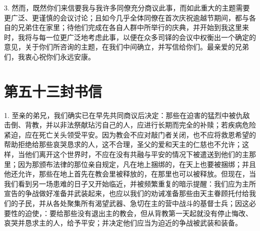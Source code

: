 3. 然而，既然你们来信要我与我许多同僚充分商议此事，而如此重大的主题需要更广泛、更谨慎的会议讨论；且如今几乎全体同僚在首次庆祝逾越节期间，都与各自的兄弟住在家里；待他们完成在各自人群中所举行的庆典，并开始到我这里来时，我将与每一位更广泛地考虑此事，以便在众多司铎的会议中权衡出一个确定的意见，关于你们所咨询的主题，在我们中间确立，并写信给你们。最亲爱的兄弟们，我衷心祝你们永远安康。\par



\section{第五十三封书信}

\par

\par

\par

1. 至亲的弟兄，我们确实已在早先共同商议后决定：那些在迫害的猛烈中被仇敌击倒、背教，并以非法祭献玷污自己的人，应进行长期而完全的补赎；若疾病危险紧迫，应在死亡关头领受平安。因为教会不应对敲门者关闭，也不应将救恩希望的帮助拒绝给那些哀哭恳求的人，这不合理，圣父的爱和天主的仁慈也不允许；这样，当他们离开这个世界时，不应在没有共融与平安的情况下被遣送到他们的主那里；因为那颁布法律的那位亲自规定，凡在地上捆绑的，在天上也要被捆绑；并且他还允许，那些在地上首先在教会里被释放的，在那里也可以被释放。但现在，当我们看到另一场患难的日子又开始临近，并被频繁重复的暗示提醒：我们应为主所宣告的争战做好准备并武装起来，也应以我们的劝诫准备那些由天主眷顾托付给我们的子民，并从各处聚集所有渴望武器、急切在主的营中战斗的基督士兵；因这必要性的迫使，：要给那些没有退出主的教会，但从背教第一天起就没有停止悔改、哀哭并恳求主的人，给予平安；并决定他们应当为迫近的争战被武装和装备。\par

